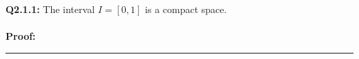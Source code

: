 \documentclass[twoside]{article}
\begin{document}
\textbf{Q2.1.1:} The interval $I = [0, 1]$ is a compact space.
\\
\\
\textbf{Proof:} 

\vskip 0.25cm
\hrule
\vskip 1cm 


   
\end{document}
